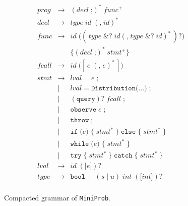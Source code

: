 \begin{figure}
  \centering
  \[
    \begin{array}{rcl}
      prog
       & \to  & (decl\;\texttt{;})^* \;func^+                                                     \\[6pt]

      decl
       & \to  & type\;\mathit{id}\;(\texttt{,}\;\mathit{id})^*                                    \\[6pt]

      func
       & \to  & \mathit{id}\;\texttt{(}
      (\,type\;\texttt{\&}?\;\mathit{id}
      (\texttt{,}\;type\;\texttt{\&}?\;\mathit{id})^*\,)?
      \texttt{)}                                                                                  \\[-2pt]
       &      & \texttt{\{}(decl\;\texttt{;})^*\;stmt^+\texttt{\}}                                \\[6pt]

      fcall
       & \to  & \mathit{id}\;\texttt{(}
      [\,e\;(\texttt{,}\;e)^*\,]
      \texttt{)}                                                                                  \\[6pt]

      stmt
       & \to  & lval\;\texttt{=}\;e\;\texttt{;}                                                   \\[-2pt]
       & \mid & lval\;\texttt{=}\;\texttt{Distribution(...)}\;\texttt{;}                          \\[-2pt]
       & \mid & (\texttt{query})?\;fcall\;\texttt{;}                                              \\[-2pt]
       & \mid & \texttt{observe}\;e\;\texttt{;}                                                   \\[-2pt]
       & \mid & \texttt{throw}\;\texttt{;}                                                        \\[-2pt]
       & \mid & \texttt{if}\;\texttt{(}e\texttt{)}\;\{\;stmt^*\;\}\;\texttt{else}\;\{\;stmt^*\;\} \\[-2pt]
       & \mid & \texttt{while}\;\texttt{(}e\texttt{)}\;\{\;stmt^*\;\}                             \\[-2pt]
       & \mid & \texttt{try}\;\{\;stmt^*\;\}\;\texttt{catch}\;\{\;stmt^*\;\}                      \\[6pt]

      lval
       & \to  & \mathit{id}\;(\texttt{[}e\texttt{]})?                                             \\[6pt]

      type
       & \to  & \texttt{bool}
      \;\mid\;(s\mid u)\;int\;(\texttt{[}int\texttt{]})?                                          \\[6pt]
    \end{array}
  \]
  \caption{Compacted grammar of \texttt{MiniProb}.}
  \label{fig:ebnf_grammar}
\end{figure}

